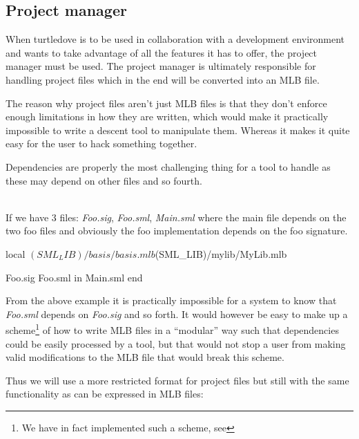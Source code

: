 \subsection{Project manager}

When turtledove is to be used in collaboration with a development environment
and wants to take advantage of all the features it has to offer, the project
manager must be used. The project manager is ultimately responsible for handling
project files which in the end will be converted into an MLB file. 

The reason why project files aren't just MLB files is that they don't enforce
enough limitations in how they are written, which would make it practically
impossible to write a descent tool to manipulate them. Whereas it makes it quite
easy for the user to hack something together.

Dependencies are properly the most challenging thing for a tool to handle as
these may depend on other files and so fourth. 

\begin{example}\ \\
  If we have 3 files: \textit{Foo.sig}, \textit{Foo.sml}, \textit{Main.sml}
  where the main file depends on the two foo files and obviously the foo
  implementation depends on the foo signature. 

  \begin{sml}
local
  $(SML_LIB)/basis/basis.mlb
  $(SML_LIB)/mylib/MyLib.mlb

  Foo.sig Foo.sml
in
  Main.sml
end    
  \end{sml}
\end{example}

\noindent
From the above example it is practically impossible for a system to know that
\textit{Foo.sml} depends on \textit{Foo.sig} and so forth. It would however be
easy to make up a scheme\footnote{We have in fact implemented such a scheme, see
  } of how to write MLB files in a ``modular'' way such that
dependencies could be easily processed by a tool, but that would not stop a user
from making valid modifications to the MLB file that would break this scheme.


Thus we will use a more restricted format for project files but still with the
same functionality as can be expressed in MLB files:

